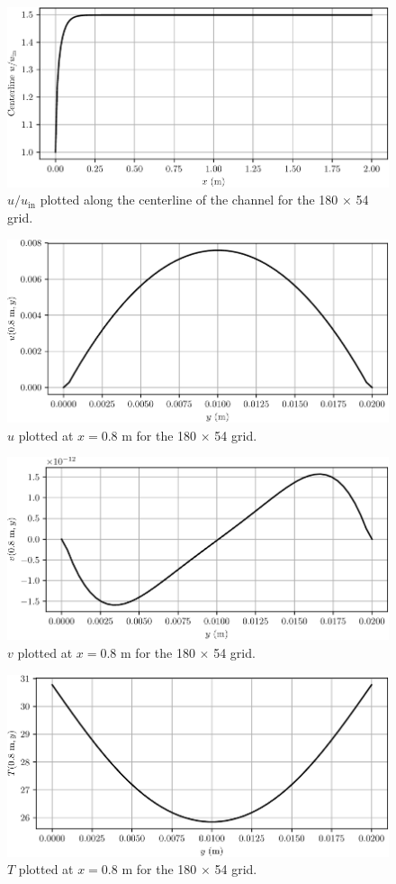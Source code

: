 \documentclass{article}
\begin{document}
\begin{figure}[H]
	\centering
	\includegraphics[width=0.75\linewidth]{../results/u_centerline}
	\caption{$u/u_\mathrm{in}$ plotted along the centerline of the channel for the 180 $\times$ 54 grid.}
	\label{fig:u-centerline}
\end{figure}

\begin{figure}[H]
	\centering
	\includegraphics[width=0.75\linewidth]{../results/u_0p8}
	\caption{$u$ plotted at $x = 0.8$ m for the 180 $\times$ 54 grid.}
	\label{fig:u-0p8}
\end{figure}

\begin{figure}[H]
	\centering
	\includegraphics[width=0.75\linewidth]{../results/v_0p8}
	\caption{$v$ plotted at $x = 0.8$ m for the 180 $\times$ 54 grid.}
	\label{fig:v-0p8}
\end{figure}

\begin{figure}[H]
	\centering
	\includegraphics[width=0.75\linewidth]{../results/T_0p8}
	\caption{$T$ plotted at $x = 0.8$ m for the 180 $\times$ 54 grid.}
	\label{fig:T-0p8}
\end{figure}
\end{document}
